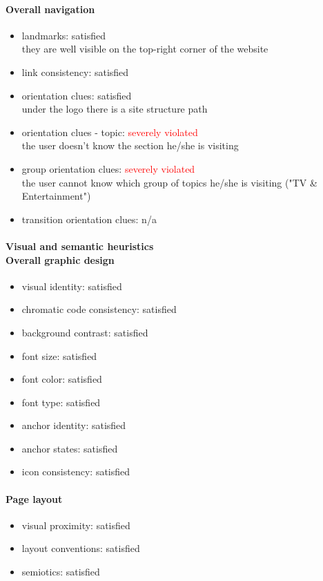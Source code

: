 \begin{enumerate}
	\paragraph*{Overall navigation}
	\begin{itemize}
		\item landmarks: satisfied\\
		they are well visible on the top-right corner of the website
		\item link consistency: satisfied
		\item orientation clues: satisfied\\
		under the logo there is a site structure path
		\item orientation clues - topic: \textcolor{red}{severely violated}\\
		the user doesn't know the section he/she is visiting
		\item group orientation clues:  \textcolor{red}{severely violated}\\
		the user cannot know which group of topics he/she is visiting ("TV \& Entertainment")
		\item transition orientation clues: n/a
	\end{itemize}	
	
	\paragraph*{Visual and semantic heuristics \\ Overall graphic design }
	\begin{itemize}
		\item visual identity: satisfied
		\item chromatic code consistency: satisfied
		\item background contrast: satisfied
		\item font size: satisfied
		\item font color: satisfied
		\item font type: satisfied
		\item anchor identity: satisfied
		\item anchor states: satisfied
		\item icon consistency: satisfied
	\end{itemize}
	
	\paragraph*{Page layout}
	\begin{itemize}
		\item visual proximity: satisfied
		\item layout conventions: satisfied
		\item semiotics: satisfied
	\end{itemize}	
	

\end{enumerate}

